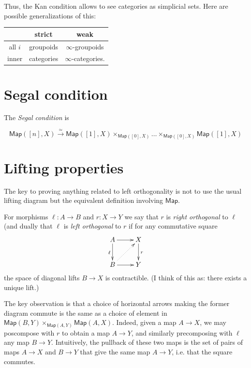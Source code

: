 Thus, the Kan condition allows to see categories
as simplicial sets. Here are possible generalizations
of this:

\begin{center}
\begin{tabular}{c | c | c}
& strict &weak\\
\hline
all $i$ & groupoids & $\infty$-groupoids\\
inner & categories & $\infty$-categories.
\end{tabular}
\end{center}

\section{Segal condition}
\label{section-segal-condition}

The {\it Segal condition} is

$$
\mathsf{Map}([n],X) \xrightarrow{\simeq}
\mathsf{Map}([1],X) \times_{\mathsf{Map}([0],X)}\ldots
\times_{\mathsf{Map}([0],X)}\mathsf{Map}([1],X)
$$

\section{Lifting properties}
\label{section-lifting-properties}

The key to proving anything related
to left orthogonality is not to use
the usual lifting diagram but
the equivalent definition involving $\mathsf{Map}$.

\begin{definition}
\label{definition-orthogonal}
For morphisms $\ell:A \to B$ and $r:X \to Y$ 
we say that $r$ is {\it right orthogonal} 
to $\ell$ (and dually that $\ell$ is 
{\it left orthogonal} to  $r$ if
for any commutative square
$$
\xymatrix{
A\ar[r]\ar[d]_{\ell}&X\ar[d]^{r}\\
B\ar@{.>}[ur]\ar[r]&Y
}
$$
the space of diagonal lifts $B \to X$ is contractible.
(I think of this as: there exists a unique lift.)
\end{definition}

\noindent
The key observation is that
a choice of horizontal arrows making the former
diagram commute is the same as a choice of element in
$\mathsf{Map}(B,Y)\times_{\mathsf{Map}(A,Y)}\mathsf{Map}(A,X)$.
Indeed, given a map $A\to X$,
we may poscompose with $r$ to obtain
a map $A \to Y$, and similarly precomposing with 
$\ell$ any map $B \to Y$.
Intuitively, the pullback
of these two maps is the set of pairs
of maps $A \to X$ and $B \to Y$
that give the same map  $A \to Y$,
i.e. that the square commutes.

